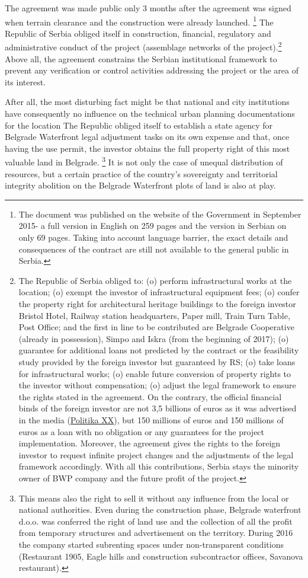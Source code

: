 \documentclass[11pt]{report}
\begin{document}
The agreement was made public only 3 months after the agreement was signed when terrain clearance and the construction were already launched.
\footnote{The document was published on the website of the Government in September 2015- a full version in English on 259 pages and the version in Serbian on only 69 pages. Taking into account language barrier, the exact details and consequences of the contract are still not available to the general public in Serbia.}
The Republic of Serbia obliged itself in construction, financial, regulatory and administrative conduct of the project (assemblage networks of the project).\footnote{The Republic of Serbia obliged to: 
(o) perform infrastructural works at the location;
(o) exempt the investor of infrastructural equipment fees;
(o) confer the property right for architectural heritage buildings to the foreign investor {Bristol Hotel, Railway station headquarters, Paper mill, Train Turn Table, Post Office; and the first in line to be contributed are Belgrade Cooperative (already in possession), Simpo and Iskra (from the beginning of 2017)};
(o) guarantee for additional loans not predicted by the contract or the feasibility study provided by the foreign investor but guaranteed by RS;
(o) take loans for infrastructural works;
(o) enable future conversion of property rights to the investor without compensation;
(o) adjust the legal framework to ensure the rights stated in the agreement.
On the contrary, the official financial binds of the foreign investor are not 3,5 billions of euros as it was advertised in the media (\href{}{Politika XX}), but 150 millions of euros and 150 millions of euros as a loan with no obligation or any guarantees for the project implementation. Moreover, the agreement gives the rights to the foreign investor to request infinite project changes and the adjustments of the legal framework accordingly.
With all this contributions, Serbia stays the minority owner of BWP company and the future profit of the project.}
Above all, the agreement constrains the Serbian institutional framework to prevent any verification or control activities addressing the project or the area of its interest.

After all, the most disturbing fact might be that national and city institutions have consequently no influence on the technical urban planning documentations for the location
The Republic obliged itself to establish a state agency for Belgrade Waterfront legal adjustment tasks on its own expense and that, once having the use permit, the investor obtains the full  property right of this most valuable land in Belgrade.
\footnote{This means also the right to sell it without any influence from the local or national authorities. Even during the construction phase, Belgrade waterfront d.o.o. was conferred the right of land use and the collection of all the profit from temporary structures and advertisement on the territory. During 2016 the company started subrenting spaces under non-transparent conditions (Restaurant 1905, Eagle hills and construction subcontractor offices, Savanova restaurant).}
It is not only the case of unequal distribution of resources, but a certain practice of the country's sovereignty and territorial integrity abolition on the Belgrade Waterfront plots of land is also at play.
\end{document}
